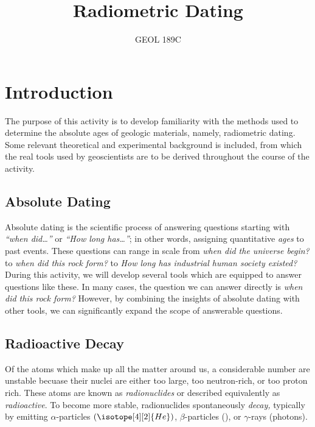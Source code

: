 \documentclass[addpoints, 12pt]{exam}
\title{Radiometric Dating}
\author{GEOL 189C}
\date{}
\begin{document}
\maketitle
\section*{Introduction}
The purpose of this activity is to develop familiarity with the methods used to determine the absolute ages of geologic materials, namely, radiometric dating. Some relevant theoretical and experimental background is included, from which the real tools used by geoscientists are to be derived throughout the course of the activity. 
\subsection*{Absolute Dating}
Absolute dating is the scientific process of answering questions starting with \emph{``when did\ldots''} or \emph{``How long has\ldots''}; in other words, assigning quantitative \emph{ages} to past events. These questions can range in scale from \emph{when did the universe begin?} to \emph{when did this rock form?} to \emph{How long has industrial human society existed?} During this activity, we will develop several tools which are equipped to answer questions like these. In many cases, the question we can answer directly is \emph{when did this rock form?} However, by combining the insights of absolute dating with other tools, we can significantly expand the scope of answerable questions.
\subsection*{Radioactive Decay}
Of the atoms which make up all the matter around us, a considerable number are unstable becuase their nuclei are either too large, too neutron-rich, or too proton rich. These atoms are known as \emph{radionuclides} or described equivalently as \emph{radioactive}. To become more stable, radionuclides spontaneously \emph{decay,} typically by emitting $\alpha$-particles $\left(\isotope[4][2]{He}\right)$, $\beta$-particles (), or $\gamma$-rays (photons). 
\end{document}
